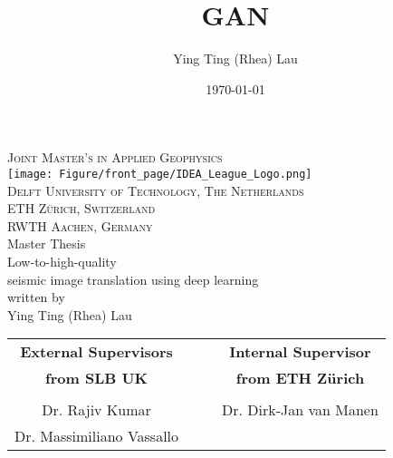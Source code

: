 \documentclass{report}
\begin{document}
\title{GAN}
\author{Ying Ting (Rhea) Lau}
\date{\today}

\begin{titlepage}

\begin{center}
\textsc{ \LARGE{Joint Master's in Applied Geophysics\\}}
\vspace{10mm}
\texttt{[image: Figure/front\_page/IDEA\_League\_Logo.png]}
\vspace{5mm}\\
\textsc{ \large{Delft University of Technology, The Netherlands\\ }}
\textsc{ \large{ETH Zürich, Switzerland\\ }}
\textsc{ \large{RWTH Aachen, Germany\\ }}
\vspace{25mm}
\textnormal{ \LARGE{Master Thesis\\}}
\vspace{5mm}
\textnormal{\huge{Low-to-high-quality \\ seismic image translation using deep learning\\}}
\vspace{5mm}
\textnormal{\large{written by\\}}
\textnormal{\Large{Ying Ting (Rhea) Lau\\}}
\vspace{25mm}
\setlength{\columnsep}{500pt}
\begin{tabular}{cccc}
\textbf{\large{External Supervisors}} & & & \textbf{\large{Internal Supervisor}} \\
\textbf{\large{from SLB UK}} & & & \textbf{\large{from ETH Zürich}} \\\\
\large{Dr. Rajiv Kumar} & & & \large{Dr. Dirk-Jan van Manen} \\
\large{Dr. Massimiliano Vassallo} &  \\
\end{tabular}
\end{center}

\vspace{20mm}

\end{titlepage}
\end{document}
